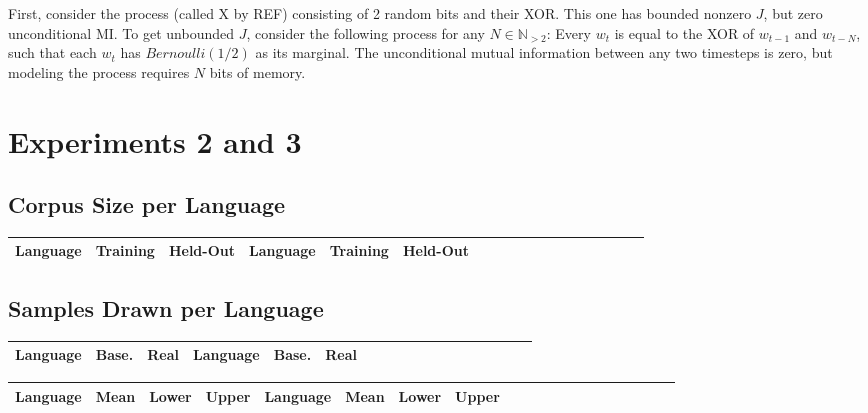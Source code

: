 \documentclass[11pt,letterpaper]{article}
\begin{document}
First, consider the process (called X by REF) consisting of 2 random bits and their XOR. This one has bounded nonzero $J$, but zero unconditional MI. To get unbounded $J$, consider the following process for any $N \in \mathbb{N}_{>2}$: Every $w_t$ is equal to the XOR of $w_{t-1}$ and $w_{t-N}$, such that each $w_t$ has $Bernoulli(1/2)$ as its marginal. The unconditional mutual information between any two timesteps is zero, but modeling the process requires $N$ bits of memory.



\section{Experiments 2 and 3}

\subsection{Corpus Size per Language}

\begin{center}
\begin{longtable}{l|ll||l|llllllllllllll}
	Language & Training & Held-Out & 	Language & Training & Held-Out\\ \hline

\end{longtable}
	\label{tab:corpora}
\end{center}

\subsection{Samples Drawn per Language}

\begin{center}
\begin{longtable}{l|ll||l|llllllllllllll}
	Language & Base. & Real & Language & Base. & Real \\ \hline

\end{longtable}
	\label{tab:samples}
\end{center}



\begin{center}
\begin{longtable}{l|lll||l|lllllllllllllll}
	Language & Mean & Lower & Upper & Language & Mean & Lower & Upper \\ \hline

\end{longtable}
	\label{tab:boot-g}
\end{center}
\end{document}
